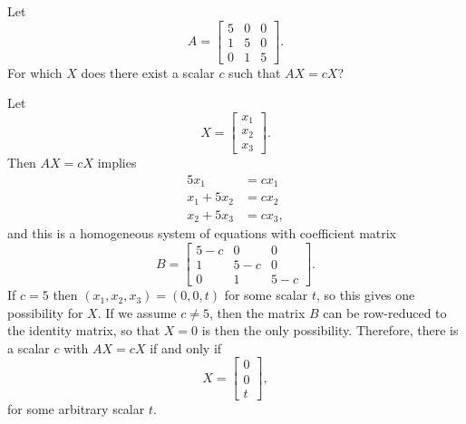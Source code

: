  Let
\begin{equation*}
  A =
  \begin{bmatrix}
    5 & 0 & 0 \\
    1 & 5 & 0 \\
    0 & 1 & 5
  \end{bmatrix}.
\end{equation*}
For which $X$ does there exist a scalar $c$ such that $AX = cX$?
\begin{solution}
  Let
  \begin{equation*}
    X =
    \begin{bmatrix}
      x_1 \\
      x_2 \\
      x_3
    \end{bmatrix}.
  \end{equation*}
  Then $AX = cX$ implies
  \begin{align*}
    5x_1 &= cx_1 \\
    x_1 + 5x_2 &= cx_2 \\
    x_2 + 5x_3 &= cx_3,
  \end{align*}
  and this is a homogeneous system of equations with coefficient
  matrix
  \begin{equation*}
    B =
    \begin{bmatrix}
      5 - c & 0 & 0 \\
      1 & 5 - c & 0 \\
      0 & 1 & 5 - c
    \end{bmatrix}.
  \end{equation*}
  If $c = 5$ then $(x_1,x_2,x_3) = (0,0,t)$ for some scalar $t$, so
  this gives one possibility for $X$. If we assume $c\neq5$, then the
  matrix $B$ can be row-reduced to the identity matrix, so that
  $X = 0$ is then the only possibility. Therefore, there is a scalar
  $c$ with $AX = cX$ if and only if
  \begin{equation*}
    X =
    \begin{bmatrix}
      0 \\
      0 \\
      t
    \end{bmatrix},
  \end{equation*}
  for some arbitrary scalar $t$.
\end{solution}
